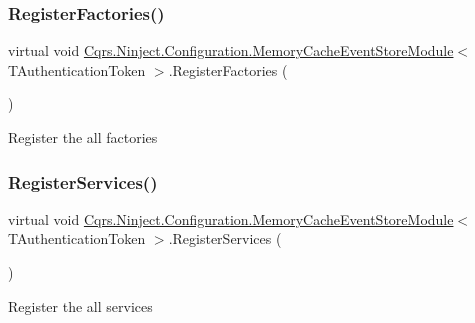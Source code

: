\subsubsection{\texorpdfstring{Register\+Factories()}{RegisterFactories()}}
{\footnotesize\ttfamily virtual void \hyperlink{classCqrs_1_1Ninject_1_1Configuration_1_1MemoryCacheEventStoreModule}{Cqrs.\+Ninject.\+Configuration.\+Memory\+Cache\+Event\+Store\+Module}$<$ T\+Authentication\+Token $>$.Register\+Factories (\begin{DoxyParamCaption}{ }\end{DoxyParamCaption})\hspace{0.3cm}{\ttfamily [virtual]}}



Register the all factories 

\mbox{\label{classCqrs_1_1Ninject_1_1Configuration_1_1MemoryCacheEventStoreModule_a114a0b9bd65f7d8554ab8aff173d0d3a}} 
\subsubsection{\texorpdfstring{Register\+Services()}{RegisterServices()}}
{\footnotesize\ttfamily virtual void \hyperlink{classCqrs_1_1Ninject_1_1Configuration_1_1MemoryCacheEventStoreModule}{Cqrs.\+Ninject.\+Configuration.\+Memory\+Cache\+Event\+Store\+Module}$<$ T\+Authentication\+Token $>$.Register\+Services (\begin{DoxyParamCaption}{ }\end{DoxyParamCaption})\hspace{0.3cm}{\ttfamily [virtual]}}



Register the all services 

